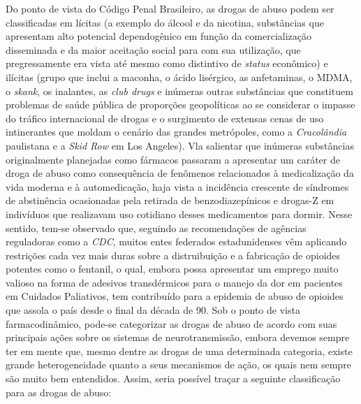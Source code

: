 \documentclass[
]{book}
\theoremstyle{definition}
\theoremstyle{definition}
\theoremstyle{definition}
\theoremstyle{definition}
\theoremstyle{remark}
\begin{document}
Do ponto de vista do Código Penal Brasileiro, as drogas de abuso podem ser classificadas em lícitas (a exemplo do álcool e da nicotina, substâncias que apresentam alto potencial dependogênico em função da comercialização disseminada e da maior aceitação social para com sua utilização, que pregressamente era vista até mesmo como distintivo de \emph{status} econômico) e ilícitas (grupo que inclui a maconha, o ácido lisérgico, as anfetaminas, o MDMA, o \emph{skank}, os inalantes, as \emph{club drugs} e inúmeras outras substâncias que constituem problemas de saúde pública de proporções geopolíticas ao se considerar o impasse do tráfico internacional de drogas e o surgimento de extensas cenas de uso intinerantes que moldam o cenário das grandes metrópoles, como a \emph{Cracolândia} paulistana e a \emph{Skid Row} em Los Angeles). Vla salientar que inúmeras substâncias originalmente planejadas como fármacos passaram a apresentar um caráter de droga de abuso como consequência de fenômenos relacionados à medicalização da vida moderna e à automedicação, haja vista a incidência crescente de síndromes de abstinência ocasionadas pela retirada de benzodiazepínicos e drogas-Z em indivíduos que realizavam uso cotidiano desses medicamentos para dormir. Nesse sentido, tem-se observado que, seguindo as recomendações de agências reguladoras como a \emph{CDC}, muitos entes federados estadunidenses vêm aplicando restrições cada vez mais duras sobre a distruibuição e a fabricação de opioides potentes como o fentanil, o qual, embora possa apresentar um emprego muito valioso na forma de adesivos transdérmicos para o manejo da dor em pacientes em Cuidados Paliativos, tem contribuído para a epidemia de abuso de opioides que assola o país desde o final da década de 90. Sob o ponto de vista farmacodinâmico, pode-se categorizar as drogas de abuso de acordo com suas principais ações sobre os sistemas de neurotransmissão, embora devemos sempre ter em mente que, mesmo dentre as drogas de uma determinada categoria, existe grande heterogeneidade quanto a seus mecanismos de ação, os quais nem sempre são muito bem entendidos. Assim, seria possível traçar a seguinte classificação para as drogas de abuso:
\end{document}
